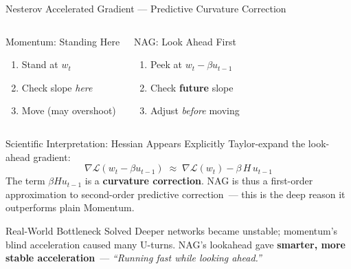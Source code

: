 \documentclass{beamer}
\begin{document}
\begin{frame}[shrink=10]{Nesterov Accelerated Gradient --- Predictive Curvature Correction}
  \begin{columns}[T]
    \begin{block}{Momentum: Standing Here}
      \begin{enumerate}\setlength\itemsep{4pt}
        \item Stand at $w_t$
        \item Check slope \emph{here}
        \item Move (may overshoot)
      \end{enumerate}
    \end{block}

    \begin{block}{NAG: Look Ahead First}
      \begin{enumerate}\setlength\itemsep{4pt}
        \item Peek at $w_t - \beta u_{t-1}$
        \item Check \textbf{future} slope
        \item Adjust \emph{before} moving
      \end{enumerate}
    \end{block}
  \end{columns}

  \medskip

  \begin{block}{Scientific Interpretation: Hessian Appears Explicitly}
    Taylor-expand the look-ahead gradient:
    \[
      \nabla\mathcal{L}(w_t - \beta u_{t-1})
        \;\approx\;
        \nabla\mathcal{L}(w_t) - \beta\,H\,u_{t-1}
    \]
    The term $\beta H u_{t-1}$ is a \textbf{curvature correction}.
    NAG is thus a first-order approximation to
    second-order predictive correction~---
    this is the deep reason it outperforms plain Momentum.
  \end{block}

  \begin{exampleblock}{Real-World Bottleneck Solved}
    Deeper networks became unstable; momentum's blind acceleration
    caused many U-turns.
    NAG's lookahead gave \textbf{smarter, more stable acceleration}~---
    \textit{``Running fast while looking ahead.''}
  \end{exampleblock}
\end{frame}
\end{document}

